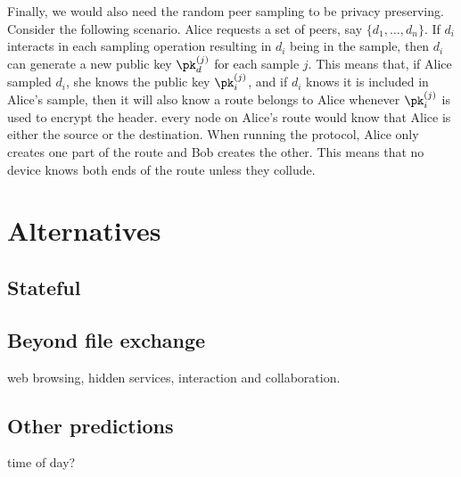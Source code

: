 Finally, we would also need the random peer sampling to be privacy preserving.
Consider the following scenario.
Alice requests a set of peers, say \(\{d_1, \dotsc, d_n\}\).
If \(d_i\) interacts in each sampling operation resulting in \(d_i\) being in 
the sample, then \(d_i\) can generate a new public key \(\pk_d^{(j)}\) for each 
sample \(j\).
This means that, if Alice sampled \(d_i\), she knows the public key 
\(\pk_i^{(j)}\), and if \(d_i\) knows it is included in Alice's sample, then it 
will also know a route belongs to Alice whenever \(\pk_i^{(j)}\) is used to 
encrypt the header.
\Ie every node on Alice's route would know that Alice is either the source or 
the destination.
When running the protocol, Alice only creates one part of the route and Bob 
creates the other.
This means that no device knows both ends of the route unless they collude.





\section{Alternatives}%
\label{Alternatives}

\subsection{Stateful \name}
\subsection{Beyond file exchange} web browsing, hidden services,
interaction and collaboration.
\subsection{Other predictions} time of day? 
